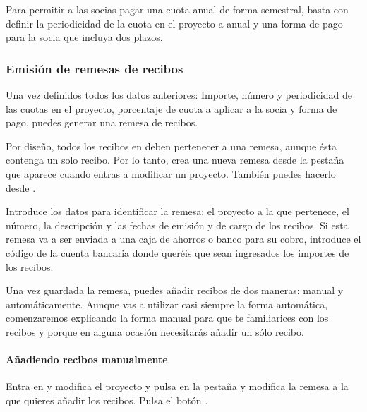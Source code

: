 Para permitir a las socias pagar una cuota anual de forma semestral,
basta con definir la periodicidad de la cuota en el proyecto a anual y
una forma de pago para la socia que incluya dos plazos.

\subsubsection{Emisión de remesas de recibos}
Una vez definidos todos los datos anteriores: Importe, número y
periodicidad de las cuotas en el proyecto, porcentaje de cuota a
aplicar a la socia y forma de pago, puedes generar una remesa de
recibos. 

Por diseño, todos los recibos en \appname deben pertenecer a una
remesa, aunque ésta contenga un solo recibo. Por lo tanto, crea una
nueva remesa desde la pestaña
 que aparece cuando
entras a modificar un proyecto. También puedes hacerlo desde
\textstyleGUIELEMENT{$\rightarrow
$}.

Introduce los datos para identificar la remesa: el proyecto a la que
pertenece, el número, la descripción y las fechas de emisión y de
cargo de los recibos. Si esta remesa va a ser enviada a una caja de
ahorros o banco para su cobro, introduce el código de la cuenta
bancaria donde queréis que sean ingresados los importes de los
recibos.

Una vez guardada la remesa, puedes añadir recibos de dos maneras:
manual y automáticamente. Aunque vas a utilizar casi siempre la forma
automática, comenzaremos explicando la forma manual para que te
familiarices con los recibos y porque en alguna ocasión necesitarás
añadir un sólo recibo.

\paragraph{Añadiendo recibos manualmente}
Entra en \textstyleGUIELEMENT{$\rightarrow $}y modifica el proyecto y pulsa en la pestaña
 y modifica la
remesa a la que quieres añadir los recibos. Pulsa el botón
.


